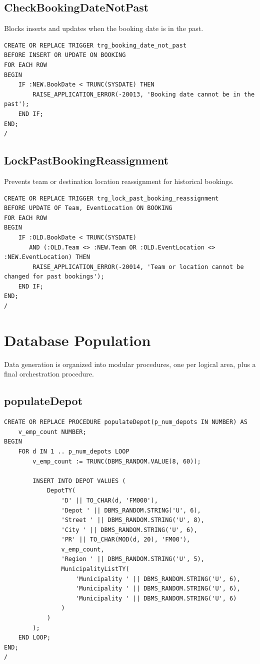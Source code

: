 \subsection*{CheckBookingDateNotPast}
Blocks inserts and updates when the booking date is in the past.

\begin{lstlisting}
CREATE OR REPLACE TRIGGER trg_booking_date_not_past
BEFORE INSERT OR UPDATE ON BOOKING
FOR EACH ROW
BEGIN
    IF :NEW.BookDate < TRUNC(SYSDATE) THEN
        RAISE_APPLICATION_ERROR(-20013, 'Booking date cannot be in the past');
    END IF;
END;
/
\end{lstlisting}

\subsection*{LockPastBookingReassignment}
Prevents team or destination location reassignment for historical bookings.

\begin{lstlisting}
CREATE OR REPLACE TRIGGER trg_lock_past_booking_reassignment
BEFORE UPDATE OF Team, EventLocation ON BOOKING
FOR EACH ROW
BEGIN
    IF :OLD.BookDate < TRUNC(SYSDATE)
       AND (:OLD.Team <> :NEW.Team OR :OLD.EventLocation <> :NEW.EventLocation) THEN
        RAISE_APPLICATION_ERROR(-20014, 'Team or location cannot be changed for past bookings');
    END IF;
END;
/
\end{lstlisting}

\section{Database Population}

Data generation is organized into modular procedures, one per logical area, plus a final orchestration procedure.

\subsection*{populateDepot}

\begin{lstlisting}
CREATE OR REPLACE PROCEDURE populateDepot(p_num_depots IN NUMBER) AS
    v_emp_count NUMBER;
BEGIN
    FOR d IN 1 .. p_num_depots LOOP
        v_emp_count := TRUNC(DBMS_RANDOM.VALUE(8, 60));

        INSERT INTO DEPOT VALUES (
            DepotTY(
                'D' || TO_CHAR(d, 'FM000'),
                'Depot ' || DBMS_RANDOM.STRING('U', 6),
                'Street ' || DBMS_RANDOM.STRING('U', 8),
                'City ' || DBMS_RANDOM.STRING('U', 6),
                'PR' || TO_CHAR(MOD(d, 20), 'FM00'),
                v_emp_count,
                'Region ' || DBMS_RANDOM.STRING('U', 5),
                MunicipalityListTY(
                    'Municipality ' || DBMS_RANDOM.STRING('U', 6),
                    'Municipality ' || DBMS_RANDOM.STRING('U', 6),
                    'Municipality ' || DBMS_RANDOM.STRING('U', 6)
                )
            )
        );
    END LOOP;
END;
/
\end{lstlisting}

